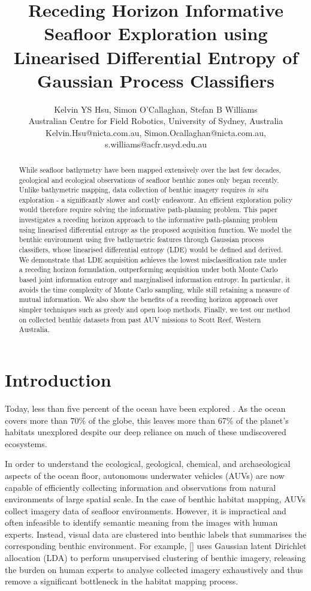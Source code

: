\documentclass{article}
\title{Receding Horizon Informative Seafloor Exploration using Linearised Differential Entropy of Gaussian Process Classifiers}
\author{Kelvin YS Hsu, Simon O'Callaghan, Stefan B Williams \\ Australian Centre for Field Robotics, University of Sydney, Australia \\ 
Kelvin.Hsu@nicta.com.au, Simon.Ocallaghan@nicta.com.au, s.williams@acfr.usyd.edu.au}
\newcommand{\incite}[1]{\citeauthor{#1} [\citeyear{#1}]}
\begin{document}
\maketitle

\begin{abstract}
	While seafloor bathymetry have been mapped extensively over the last few decades, geological and ecological observations of seafloor benthic zones only began recently. Unlike bathymetric mapping, data collection of benthic imagery requires \textit{in situ} exploration - a significantly slower and costly endeavour. An efficient exploration policy would therefore require solving the informative path-planning problem. This paper investigates a receding horizon approach to the informative path-planning problem using linearised differential entropy as the proposed acquisition function. We model the benthic environment using five bathymetric features through Gaussian process classifiers, whose linearised differential entropy (LDE) would be defined and derived. We demonstrate that LDE acquisition achieves the lowest misclassification rate under a receding horizon formulation, outperforming acquisition under both Monte Carlo based joint information entropy and marginalised information entropy. In particular, it avoids the time complexity of Monte Carlo sampling, while still retaining a measure of mutual information. We also show the benefits of a receding horizon approach over simpler techniques such as greedy and open loop methods. Finally, we test our method on collected benthic datasets from past AUV missions to Scott Reef, Western Australia.
\end{abstract}

\section{Introduction}
\label{Section:Introduction}

	Today, less than five percent of the ocean have been explored \cite{NOAA}. As the ocean covers more than 70\% of the globe, this leaves more than 67\% of the planet's habitats unexplored despite our deep reliance on much of these undiscovered ecosystems.
	
	In order to understand the ecological, geological, chemical, and archaeological aspects of the ocean floor, autonomous underwater vehicles (AUVs) are now capable of efficiently collecting information and observations from natural environments of large spatial scale. In the case of benthic habitat mapping, AUVs collect imagery data of seafloor environments. However, it is impractical and often infeasible to identify semantic meaning from the images with human experts. Instead, visual data are clustered into benthic labels that summarises the corresponding benthic environment. For example, \incite{Steinberg2015128} uses Gaussian latent Dirichlet allocation (LDA) to perform unsupervised clustering of benthic imagery, releasing the burden on human experts to analyse collected imagery exhaustively and thus remove a significant bottleneck in the habitat mapping process.
\end{document}
